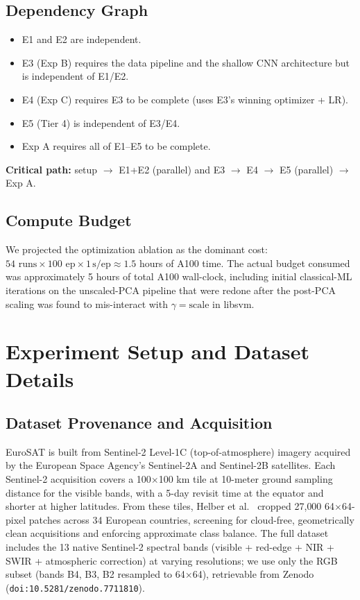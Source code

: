 \documentclass[10pt,letterpaper]{article}
\begin{document}
\subsection{Dependency Graph}
\begin{itemize}[leftmargin=2em]
    \item E1 and E2 are independent.
    \item E3 (Exp B) requires the data pipeline and the shallow CNN architecture but is independent of E1/E2.
    \item E4 (Exp C) requires E3 to be complete (uses E3's winning optimizer + LR).
    \item E5 (Tier 4) is independent of E3/E4.
    \item Exp A requires all of E1--E5 to be complete.
\end{itemize}
\textbf{Critical path:} setup $\rightarrow$ E1+E2 (parallel) and E3 $\rightarrow$ E4 $\rightarrow$ E5 (parallel) $\rightarrow$ Exp A.

\subsection{Compute Budget}
We projected the optimization ablation as the dominant cost: $54 \text{ runs} \times 100 \text{ ep} \times 1\,\text{s/ep} \approx 1.5$ hours of A100 time. The actual budget consumed was approximately 5 hours of total A100 wall-clock, including initial classical-ML iterations on the unscaled-PCA pipeline that were redone after the post-PCA scaling was found to mis-interact with $\gamma{=}\text{scale}$ in libsvm.

\section{Experiment Setup and Dataset Details}
\label{sec:setup}

\subsection{Dataset Provenance and Acquisition}
EuroSAT is built from Sentinel-2 Level-1C (top-of-atmosphere) imagery acquired by the European Space Agency's Sentinel-2A and Sentinel-2B satellites. Each Sentinel-2 acquisition covers a 100$\times$100 km tile at 10-meter ground sampling distance for the visible bands, with a 5-day revisit time at the equator and shorter at higher latitudes. From these tiles, Helber et al.~\cite{helber2019} cropped 27{,}000 64$\times$64-pixel patches across 34 European countries, screening for cloud-free, geometrically clean acquisitions and enforcing approximate class balance. The full dataset includes the 13 native Sentinel-2 spectral bands (visible + red-edge + NIR + SWIR + atmospheric correction) at varying resolutions; we use only the RGB subset (bands B4, B3, B2 resampled to 64$\times$64), retrievable from Zenodo (\texttt{doi:10.5281/zenodo.7711810}).
\end{document}
